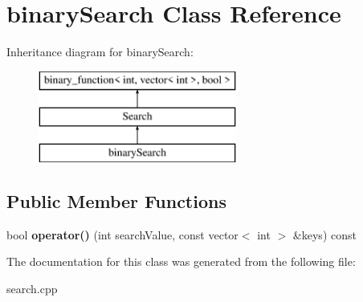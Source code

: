 \hypertarget{classbinary_search}{\section{binary\+Search Class Reference}
\label{classbinary_search}
}
Inheritance diagram for binary\+Search\+:\begin{figure}[H]
\begin{center}
\leavevmode
\includegraphics[height=3.000000cm]{classbinary_search}
\end{center}
\end{figure}
\subsection*{Public Member Functions}
\begin{DoxyCompactItemize}
\item 
\hypertarget{classbinary_search_a8e145edfb29183d7e1b265bd4cf4293f}{bool {\bfseries operator()} (int search\+Value, const vector$<$ int $>$ \&keys) const }\label{classbinary_search_a8e145edfb29183d7e1b265bd4cf4293f}

\end{DoxyCompactItemize}


The documentation for this class was generated from the following file\+:\begin{DoxyCompactItemize}
\item 
search.\+cpp\end{DoxyCompactItemize}
